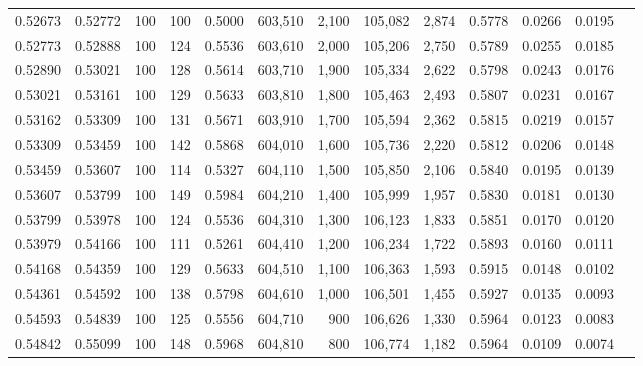 \begin{tabular}{rrrrrrrrrrrrr}
0.52673 & 0.52772 &   100 & 100 &                                     0.5000 & 603,510 &   2,100 & 105,082 &   2,874 & 0.5778 & 0.0266 & 0.0195 \\
0.52773 & 0.52888 &   100 & 124 &                                     0.5536 & 603,610 &   2,000 & 105,206 &   2,750 & 0.5789 & 0.0255 & 0.0185 \\
0.52890 & 0.53021 &   100 & 128 &                                     0.5614 & 603,710 &   1,900 & 105,334 &   2,622 & 0.5798 & 0.0243 & 0.0176 \\
0.53021 & 0.53161 &   100 & 129 &                                     0.5633 & 603,810 &   1,800 & 105,463 &   2,493 & 0.5807 & 0.0231 & 0.0167 \\
0.53162 & 0.53309 &   100 & 131 &                                     0.5671 & 603,910 &   1,700 & 105,594 &   2,362 & 0.5815 & 0.0219 & 0.0157 \\
0.53309 & 0.53459 &   100 & 142 &                                     0.5868 & 604,010 &   1,600 & 105,736 &   2,220 & 0.5812 & 0.0206 & 0.0148 \\
0.53459 & 0.53607 &   100 & 114 &                                     0.5327 & 604,110 &   1,500 & 105,850 &   2,106 & 0.5840 & 0.0195 & 0.0139 \\
0.53607 & 0.53799 &   100 & 149 &                                     0.5984 & 604,210 &   1,400 & 105,999 &   1,957 & 0.5830 & 0.0181 & 0.0130 \\
0.53799 & 0.53978 &   100 & 124 &                                     0.5536 & 604,310 &   1,300 & 106,123 &   1,833 & 0.5851 & 0.0170 & 0.0120 \\
0.53979 & 0.54166 &   100 & 111 &                                     0.5261 & 604,410 &   1,200 & 106,234 &   1,722 & 0.5893 & 0.0160 & 0.0111 \\
0.54168 & 0.54359 &   100 & 129 &                                     0.5633 & 604,510 &   1,100 & 106,363 &   1,593 & 0.5915 & 0.0148 & 0.0102 \\
0.54361 & 0.54592 &   100 & 138 &                                     0.5798 & 604,610 &   1,000 & 106,501 &   1,455 & 0.5927 & 0.0135 & 0.0093 \\
0.54593 & 0.54839 &   100 & 125 &                                     0.5556 & 604,710 &     900 & 106,626 &   1,330 & 0.5964 & 0.0123 & 0.0083 \\
0.54842 & 0.55099 &   100 & 148 &                                     0.5968 & 604,810 &     800 & 106,774 &   1,182 & 0.5964 & 0.0109 & 0.0074 \\

\end{tabular}
